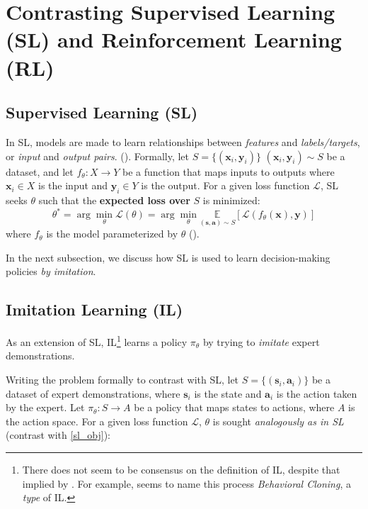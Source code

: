 \documentclass{article} %
\begin{document}
\section{Contrasting Supervised Learning (SL) and Reinforcement Learning (RL)}
\subsection{Supervised Learning (SL)}

In SL, models are made to learn relationships between \textit{features} and \textit{labels/targets}, 
or \textit{input} and \textit{output pairs}. (\cite{Goodfellow-et-al-2016}). 
Formally, let \st{$S = \{(\mathbf{x}_i, \mathbf{y}_i)\}$} {\color{red} $(\mathbf{x}_i, \mathbf{y}_i) \sim S$} be a dataset, 
and let $f_\theta: X \to Y$ be a function that maps inputs to outputs
where $\mathbf{x}_i \in X$ is the input and $\mathbf{y}_i \in Y$ is the output.
For a given loss function $\mathcal{L}$, SL seeks $\theta$ 
such that the \textbf{expected loss over} $S$ is minimized:
\begin{equation} \label{sl_obj}
    \theta^* = \arg\min_\theta \mathcal{L}(\theta) = \arg\min_\theta \underset{(\mathbf{s}, \mathbf{a}) \sim S}{\mathbb{E}}[\mathcal{L}(f_\theta(\mathbf{x}), \mathbf{y})]
\end{equation}
where $f_\theta$ is the model parameterized by $\theta$ (\cite{Levine-et-al-2023}).

In the next subsection, we discuss how SL is used to learn decision-making policies \textit{by imitation}.

\subsection{Imitation Learning (IL)}

As an extension of SL, IL\footnote{There does not seem to be consensus on the definition of IL, despite that implied by \cite{Levine-et-al-2023}. For example, \cite{Underactuated-2023} seems to name this process \textit{Behavioral Cloning}, a \textit{type} of IL.} 
learns a policy $\pi_\theta$ by trying to \textit{imitate} expert demonstrations.

Writing the problem formally to contrast with SL,
let $S = \{(\mathbf{s}_i, \mathbf{a}_i)\}$ be a dataset of expert demonstrations, 
where $\mathbf{s}_i$ is the state and $\mathbf{a}_i$ is the action taken by the expert.
Let $\pi_\theta: S \to A$ be a policy that maps states to actions, where $A$ is the action space. 
For a given loss function $\mathcal{L}$, $\theta$ is sought \textit{analogously as in SL}
(contrast with \ref{sl_obj}):
\end{document}
